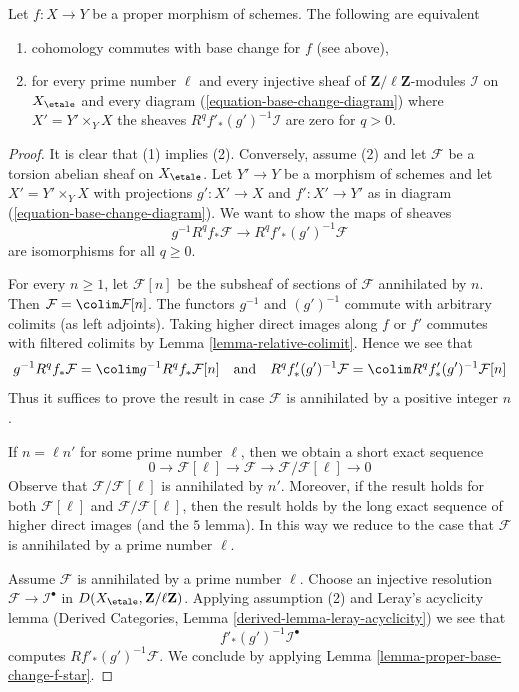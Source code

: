 \begin{lemma}
\label{lemma-proper-base-change-in-terms-of-injectives}
Let $f : X \to Y$ be a proper morphism of schemes.
The following are equivalent
\begin{enumerate}
\item cohomology commutes with base change for $f$ (see above),
\item for every prime number $\ell$ and every injective
sheaf of $\mathbf{Z}/\ell\mathbf{Z}$-modules $\mathcal{I}$
on $X_\etale$ and every diagram (\ref{equation-base-change-diagram})
where $X' = Y' \times_Y X$ the sheaves
$R^qf'_*(g')^{-1}\mathcal{I}$ are zero for $q > 0$.
\end{enumerate}
\end{lemma}

\begin{proof}
It is clear that (1) implies (2). Conversely, assume (2) and let
$\mathcal{F}$ be a torsion abelian sheaf on $X_\etale$. Let $Y' \to Y$
be a morphism of schemes and let $X' = Y' \times_Y X$
with projections $g' : X' \to X$ and $f' : X' \to Y'$ as in
diagram (\ref{equation-base-change-diagram}).
We want to show the maps of sheaves
$$
g^{-1}R^qf_*\mathcal{F} \longrightarrow R^qf'_*(g')^{-1}\mathcal{F}
$$
are isomorphisms for all $q \geq 0$.

\medskip\noindent
For every $n \geq 1$, let $\mathcal{F}[n]$ be the subsheaf of sections
of $\mathcal{F}$ annihilated by $n$. Then
$\mathcal{F} = \colim \mathcal{F}[n]$.
The functors $g^{-1}$ and $(g')^{-1}$ commute with arbitrary colimits
(as left adjoints). Taking higher direct images along $f$ or $f'$
commutes with filtered colimits by Lemma \ref{lemma-relative-colimit}.
Hence we see that
$$
g^{-1}R^qf_*\mathcal{F} = \colim g^{-1}R^qf_*\mathcal{F}[n]
\quad\text{and}\quad
R^qf'_*(g')^{-1}\mathcal{F} =
\colim R^qf'_*(g')^{-1}\mathcal{F}[n]
$$
Thus it suffices to prove the result in case $\mathcal{F}$ is
annihilated by a positive integer $n$.

\medskip\noindent
If $n = \ell n'$ for some prime number $\ell$, then we obtain a short
exact sequence
$$
0 \to \mathcal{F}[\ell] \to \mathcal{F} \to
\mathcal{F}/\mathcal{F}[\ell] \to 0
$$
Observe that $\mathcal{F}/\mathcal{F}[\ell]$ is annihilated by $n'$.
Moreover, if the result holds for both $\mathcal{F}[\ell]$ and
$\mathcal{F}/\mathcal{F}[\ell]$, then the result holds by
the long exact sequence of higher direct images (and the $5$ lemma).
In this way we reduce to the case that $\mathcal{F}$ is annihilated
by a prime number $\ell$.

\medskip\noindent
Assume $\mathcal{F}$ is annihilated by a prime number $\ell$.
Choose an injective resolution $\mathcal{F} \to \mathcal{I}^\bullet$
in $D(X_\etale, \mathbf{Z}/\ell\mathbf{Z})$. Applying assumption
(2) and Leray's acyclicity lemma
(Derived Categories, Lemma \ref{derived-lemma-leray-acyclicity})
we see that
$$
f'_*(g')^{-1}\mathcal{I}^\bullet
$$
computes $Rf'_*(g')^{-1}\mathcal{F}$. We conclude by applying
Lemma \ref{lemma-proper-base-change-f-star}.
\end{proof}
